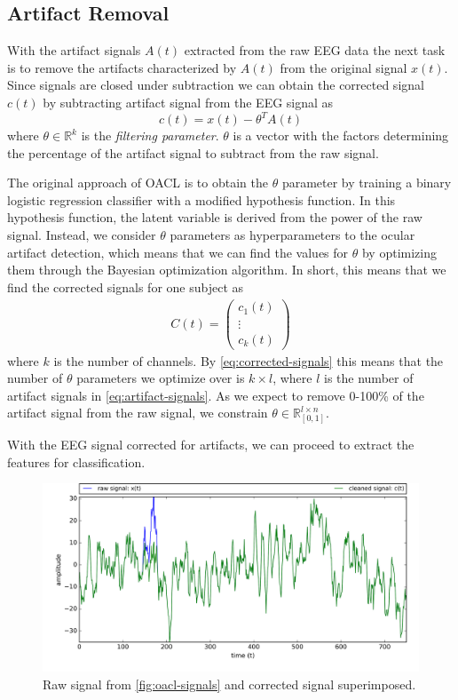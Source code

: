 \subsection{Artifact Removal}
With the artifact signals $A(t)$ extracted from the raw EEG data the next task is to remove the artifacts characterized by $A(t)$ from the original signal $x(t)$. Since signals are closed under subtraction we can obtain the corrected signal $c(t)$ by subtracting artifact signal from the EEG signal as
\begin{equation}\label{eq:corrected-signal}
c(t) = x(t) - \theta^T A(t)
\end{equation}
where $\theta \in \mathbb{R}^{k}$ is the \emph{filtering parameter}. $\theta$ is a vector with the factors determining the percentage of the artifact signal to subtract from the raw signal. 

The original approach of OACL is to obtain the $\theta$ parameter by training a binary logistic regression classifier with a modified hypothesis function. In this hypothesis function, the latent variable is derived from the power of the raw signal. Instead, we consider $\theta$ parameters as hyperparameters to the ocular artifact detection, which means that we can find the values for $\theta$ by optimizing them through the Bayesian optimization algorithm. In short, this means that we find the corrected signals for one subject as
\begin{align}\label{eq:corrected-signals}
C(t)=  \begin{pmatrix}
c_1(t) \\
\vdots  \\
c_{k}(t) 
\end{pmatrix}
\end{align}
where $k$ is the number of channels. By \cref{eq:corrected-signals} this means that the number of $\theta$ parameters we optimize over is $k \times l$, where $l$ is the number of artifact signals in \cref{eq:artifact-signals}. As we expect to remove 0-100\% of the artifact signal from the raw signal, we constrain $\theta \in \mathbb{R}^{l\times n}_{[0,1]}$.

With the EEG signal corrected for artifacts, we can proceed to extract the features for classification.
\begin{figure}%
	\centering
	\includegraphics[width=1\textwidth]{figures/cleaned-oacl-signal.png}
	\vspace{-2em}
	\caption{Raw signal from \cref{fig:oacl-signals} and corrected signal superimposed.}
	\label{fig:cleaned-oacl-signals}
\end{figure}